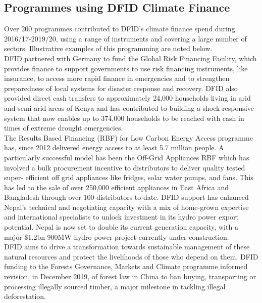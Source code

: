 \subsection{Programmes using DFID Climate Finance}
Over 200 programmes contributed to DFID's climate finance spend during 2016/17-2019/20, using a range of instruments and covering a large number of sectors. %
Illustrative examples of this programming are noted below. \\%

DFID partnered with Germany to fund the Global Risk Financing Facility, which provides finance to support governments to use risk financing instruments, like insurance, to access more rapid finance in emergencies and to strengthen preparedness of local systems for disaster response and recovery. %
DFID also provided direct cash transfers to approximately 24,000 households living in arid and semi-arid areas of Kenya and has contributed to building a shock responsive system that now enables up to 374,000 households to be reached with cash in times of extreme drought emergencies. \\%

The Results Based Financing (RBF) for Low Carbon Energy Access programme has, since 2012 delivered energy access to at least 5.7 million people. %
A particularly successful model has been the Off-Grid Appliances RBF which has involved a bulk procurement incentive to distributors to deliver quality tested super- efficient off grid appliances like fridges, solar water pumps, and fans. This has led to the sale of over 250,000 efficient appliances in East Africa and Bangladesh through over 100 distributors to date. %
DFID support has enhanced Nepal's technical and negotiating capacity with a mix of home-grown expertise and international specialists to unlock investment in its hydro power export potential. %
Nepal is now set to double its current generation capacity, with a major \$1.2bn 900MW hydro power project currently under construction. \\%

DFID aims to drive a transformation towards sustainable management of these natural resources and protect the livelihoods of those who depend on them. %
DFID funding to the Forests Governance, Markets and Climate programme informed revision, in December 2019, of forest law in China to ban buying, transporting or processing illegally sourced timber, a major milestone in tackling illegal deforestation. \\%

